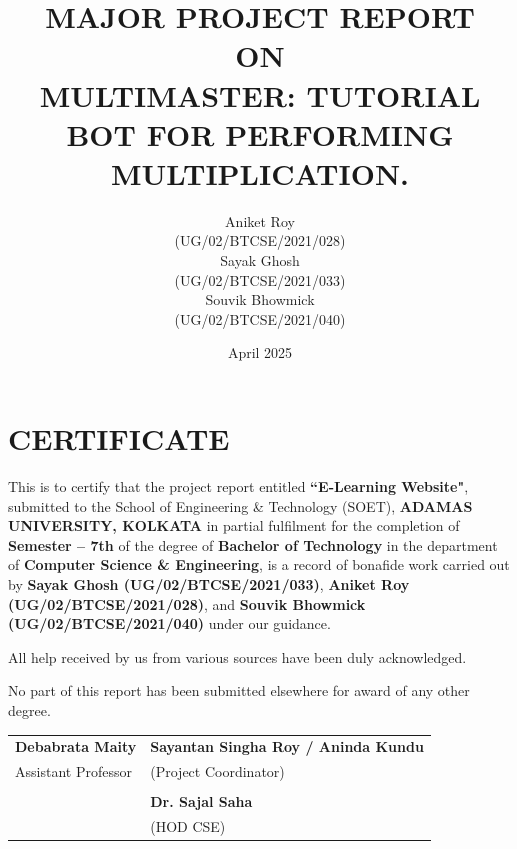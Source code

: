 \documentclass[BTech]{audiss}
\begin{document}
\title{\uppercase{Major Project Report \\on \\ Multimaster: Tutorial bot for performing multiplication.}}

\author{Aniket Roy\\ (UG/02/BTCSE/2021/028) \\Sayak Ghosh\\ (UG/02/BTCSE/2021/033) \\ Souvik Bhowmick \\ (UG/02/BTCSE/2021/040) }


\date{April 2025}

\maketitle
\newpage
\section*{CERTIFICATE}
This is to certify that the project report entitled \textbf{``E-Learning Website"}, submitted to the School of Engineering \& Technology (SOET), \textbf{ADAMAS UNIVERSITY, KOLKATA} in partial fulfilment for the completion of \textbf{Semester -- 7th} of the degree of \textbf{Bachelor of Technology} in the department of \textbf{Computer Science \& Engineering}, is a record of bonafide work carried out by \textbf{Sayak Ghosh (UG/02/BTCSE/2021/033)}, \textbf{Aniket Roy (UG/02/BTCSE/2021/028)}, and \textbf{Souvik Bhowmick (UG/02/BTCSE/2021/040)} under our guidance.

All help received by us from various sources have been duly acknowledged.

No part of this report has been submitted elsewhere for award of any other degree.

\vspace{1cm}
\begin{tabular}{p{}p{}}
    \textbf{Debabrata Maity} & \textbf{Sayantan Singha Roy / Aninda Kundu}\\
    Assistant Professor & (Project Coordinator)\\
    & \\
    & \textbf{Dr. Sajal Saha}\\
    & (HOD CSE)
\end{tabular}
\newpage
\end{document}
